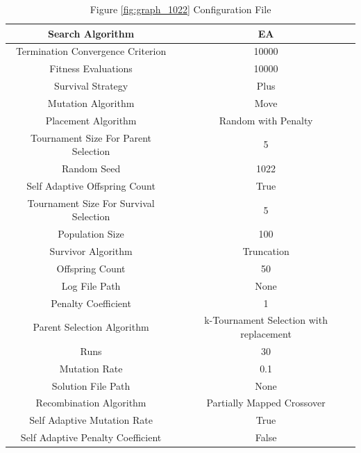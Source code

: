\documentclass{standalone}
\begin{document}
\begin{table}[!htb]
	\centering
	\caption{Figure \ref{fig:graph_1022} Configuration File}
	\label{tab:graph_1022}
	\begin{tabular}{| c | c |}
		\hline
		Search Algorithm		& EA		 \\
		\hline
		Termination Convergence Criterion		& 10000		 \\
		\hline
		Fitness Evaluations		& 10000		 \\
		\hline
		Survival Strategy		& Plus		 \\
		\hline
		Mutation Algorithm		& Move		 \\
		\hline
		Placement Algorithm		& Random with Penalty		 \\
		\hline
		Tournament Size For Parent Selection		& 5		 \\
		\hline
		Random Seed		& 1022		 \\
		\hline
		Self Adaptive Offspring Count		& True		 \\
		\hline
		Tournament Size For Survival Selection		& 5		 \\
		\hline
		Population Size		& 100		 \\
		\hline
		Survivor Algorithm		& Truncation		 \\
		\hline
		Offspring Count		& 50		 \\
		\hline
		Log File Path		& None		 \\
		\hline
		Penalty Coefficient		& 1		 \\
		\hline
		Parent Selection Algorithm		& k-Tournament Selection with replacement		 \\
		\hline
		Runs		& 30		 \\
		\hline
		Mutation Rate		& 0.1		 \\
		\hline
		Solution File Path		& None		 \\
		\hline
		Recombination Algorithm		& Partially Mapped Crossover		 \\
		\hline
		Self Adaptive Mutation Rate		& True		 \\
		\hline
		Self Adaptive Penalty Coefficient		& False		 \\
		\hline
	\end{tabular}
\end{table}
\end{document}

